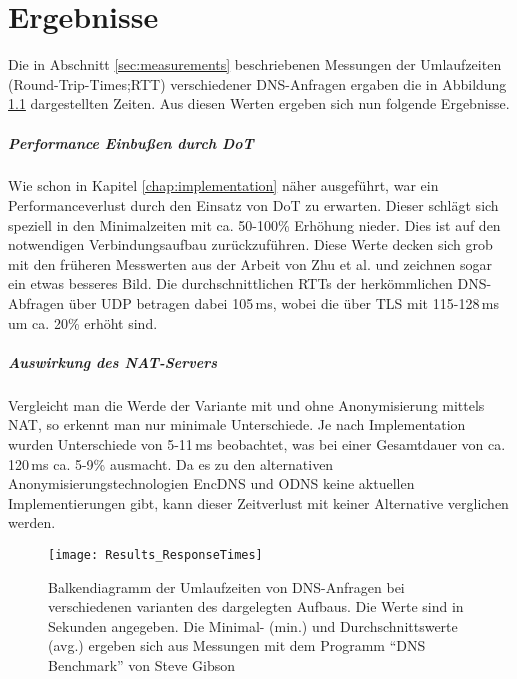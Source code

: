 \chapter{Ergebnisse}
\label{chap:results}

Die in Abschnitt \ref{sec:measurements} beschriebenen Messungen der Umlaufzeiten (Round-Trip-Times;RTT) verschiedener DNS-Anfragen ergaben die in Abbildung \ref{img:results-times} dargestellten Zeiten. Aus diesen Werten ergeben sich nun folgende Ergebnisse.

\paragraph{Performance Einbußen durch DoT}
Wie schon in Kapitel \ref{chap:implementation} näher ausgeführt, war ein Performanceverlust durch den Einsatz von DoT zu erwarten. Dieser schlägt sich speziell in den Minimalzeiten mit ca. 50-100\% Erhöhung nieder. Dies ist auf den notwendigen Verbindungsaufbau zurückzuführen. Diese Werte decken sich grob mit den früheren Messwerten aus der Arbeit von Zhu et al.\cite{Zhu2015} und zeichnen sogar ein etwas besseres Bild. Die durchschnittlichen RTTs der herkömmlichen DNS-Abfragen über UDP betragen dabei 105\,ms, wobei die über TLS mit 115-128\,ms um ca. 20\% erhöht sind.

\paragraph{Auswirkung des NAT-Servers}
Vergleicht man die Werde der Variante mit und ohne Anonymisierung mittels NAT, so erkennt man nur minimale Unterschiede. Je nach Implementation wurden Unterschiede von 5-11\,ms beobachtet, was bei einer Gesamtdauer von ca. 120\,ms ca. 5-9\% ausmacht. Da es zu den alternativen Anonymisierungstechnologien EncDNS und ODNS keine aktuellen Implementierungen gibt, kann dieser Zeitverlust mit keiner Alternative verglichen werden.

\begin{figure}[hb]
    \centering
    \texttt{[image: Results\_ResponseTimes]}
    \caption{Balkendiagramm der Umlaufzeiten von DNS-Anfragen bei verschiedenen varianten des dargelegten Aufbaus. Die Werte sind in Sekunden angegeben. Die Minimal- (min.) und Durchschnittswerte (avg.) ergeben sich aus Messungen mit dem Programm ``DNS Benchmark'' von Steve Gibson}
    \label{img:results-times}
\end{figure}